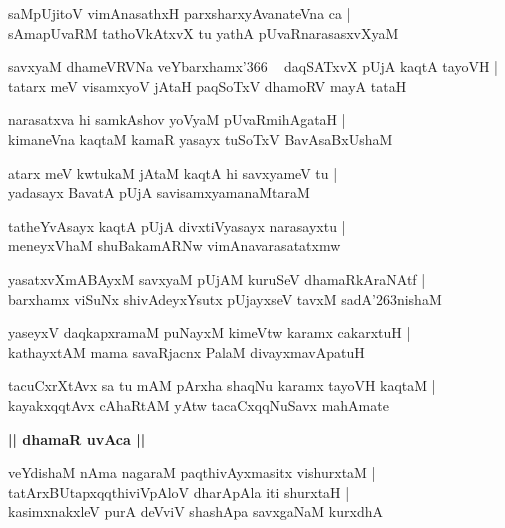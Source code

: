 \documentclass[twoside,12pt,openright]{book}
\def\S{\char'263}
\newcounter{shloka}[chapter]
\def\uvaca#1{\centerline{{\large\textbf{#1}}}}
\begin{document}
\begin{shloka}%
saMpUjitoV vimAnasathxH parxsharxyAvanateVna ca |\\
sAmapUvaRM tathoVkAtxvX tu yathA pUvaRnarasasxvXyaM 
\end{shloka}

\begin{shloka}%
savxyaM dhameVRVNa veYbarxhamx\char'366 ~ daqSATxvX pUjA kaqtA tayoVH |\\
tatarx meV visamxyoV jAtaH paqSoTxV dhamoRV mayA tataH 
\end{shloka}

\begin{shloka}%
narasatxva hi samkAshov yoVyaM pUvaRmihAgataH |\\
kimaneVna kaqtaM kamaR yasayx tuSoTxV BavAsaBxUshaM
\end{shloka}

\begin{shloka}%
atarx meV kwtukaM jAtaM kaqtA hi savxyameV tu |\\
yadasayx BavatA pUjA savisamxyamanaMtaraM 
\end{shloka}

\begin{shloka}%
tatheYvAsayx kaqtA pUjA divxtiVyasayx narasayxtu |\\
meneyxVhaM shuBakamARNw vimAnavarasatatxmw 
\end{shloka}

\begin{shloka}%
yasatxvXmABAyxM savxyaM pUjAM kuruSeV dhamaRkAraNAtf |\\
barxhamx viSuNx shivAdeyxYsutx pUjayxseV tavxM sadA\S nishaM 
\end{shloka}

\begin{shloka}%
yaseyxV daqkapxramaM puNayxM kimeVtw karamx cakarxtuH |\\
kathayxtAM mama savaRjacnx PalaM divayxmavApatuH
\end{shloka}

\begin{shloka}%
tacuCxrXtAvx sa tu mAM pArxha shaqNu karamx tayoVH kaqtaM |\\
kayakxqqtAvx cAhaRtAM yAtw tacaCxqqNuSavx mahAmate
\end{shloka}

\uvaca{|| dhamaR uvAca ||}

\begin{shloka}%
veYdishaM nAma nagaraM paqthivAyxmasitx vishurxtaM |\\
tatArxBUtapxqqthiviVpAloV dharApAla iti shurxtaH |\\
kasimxnakxleV purA deVviV shashApa savxgaNaM kurxdhA
\end{shloka}
\end{document}
